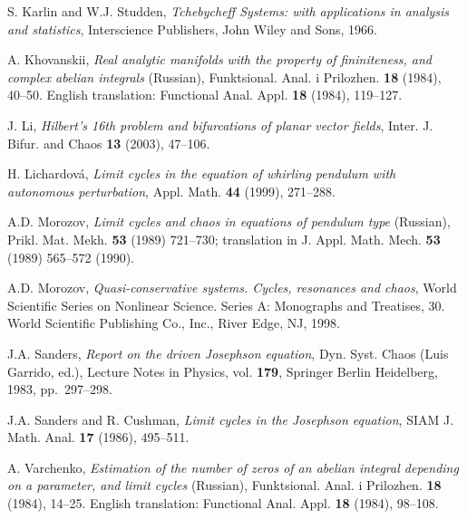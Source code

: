 \documentclass[12pt,psamsfonts]{amsart}
\begin{document}
\begin{thebibliography}{10}
S. Karlin and W.J. Studden, \emph{{Tchebycheff Systems: with
  applications in analysis and statistics}}, Interscience Publishers, John
  Wiley and Sons, 1966.

  A. Khovanskii, \emph{Real analytic manifolds with the
property of fininiteness, and complex abelian integrals} (Russian), Funktsional. Anal. i
Prilozhen. \textbf{18} (1984), 40--50. English translation: Functional Anal. Appl. \textbf{18}
(1984), 119--127.

  J. Li, \emph{Hilbert's 16th problem and bifurcations
of planar vector fields}, Inter. J. Bifur. and Chaos \textbf{13} (2003), 47--106.

  H. Lichardov\'{a},  \emph{Limit cycles in the
equation of whirling pendulum with autonomous perturbation}, Appl. Math. \textbf{44} (1999),
271--288.

A.D. Morozov,
  \emph{Limit cycles and chaos in equations of pendulum type} (Russian), Prikl. Mat. Mekh.
  \textbf{53}  (1989) 721--730; translation in J. Appl. Math. Mech. \textbf{53} (1989) 565--572
  (1990).

A.D. Morozov,  \emph{Quasi-conservative systems. Cycles, resonances and chaos}, World Scientific
Series on Nonlinear Science. Series A: Monographs and Treatises, 30. World Scientific Publishing
Co., Inc., River Edge, NJ, 1998.

J.A. Sanders, \emph{{Report on the driven Josephson equation}}, Dyn. Syst.
  Chaos (Luis Garrido, ed.), Lecture Notes in Physics, vol. \textbf{179}, Springer
  Berlin Heidelberg, 1983, pp.~297--298.

J.A. Sanders and R. Cushman, \emph{{Limit cycles in the Josephson
  equation}}, SIAM J. Math. Anal. \textbf{17} (1986),  495--511.

 A. Varchenko, \emph{ Estimation of the number of zeros of an
abelian integral depending on a parameter, and limit cycles} (Russian), Funktsional. Anal. i
Prilozhen. \textbf{18} (1984), 14--25. English translation: Functional Anal. Appl. \textbf{18}
(1984), 98--108.

\end{thebibliography}
\end{document}
